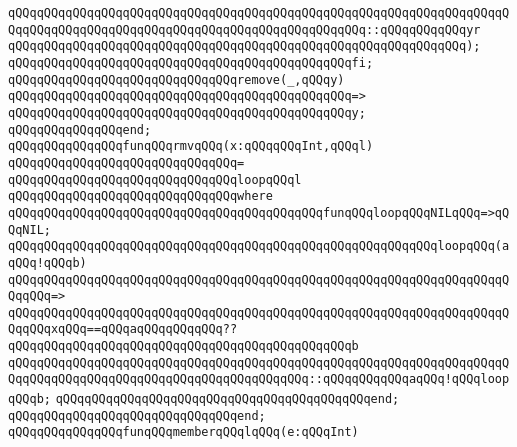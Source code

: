 \verb|qQQqqQQqqQQqqQQqqQQqqQQqqQQqqQQqqQQqqQQqqQQqqQQqqQQqqQQqqQQqqQQqqQQqqQQqqQQqqQQqqQQqqQQqqQQqqQQqqQQqqQQqqQQqqQQqqQQqqQQq::qQQqqQQqqQQqyr|\newline
\verb|qQQqqQQqqQQqqQQqqQQqqQQqqQQqqQQqqQQqqQQqqQQqqQQqqQQqqQQqqQQqqQQq);|\newline
\verb|qQQqqQQqqQQqqQQqqQQqqQQqqQQqqQQqqQQqqQQqqQQqqQQqfi;|\newline
\newline
\verb|qQQqqQQqqQQqqQQqqQQqqQQqqQQqqQQqremove(_,qQQqy)|\newline
\verb|qQQqqQQqqQQqqQQqqQQqqQQqqQQqqQQqqQQqqQQqqQQqqQQq=>|\newline
\verb|qQQqqQQqqQQqqQQqqQQqqQQqqQQqqQQqqQQqqQQqqQQqqQQqy;|\newline
\verb|qQQqqQQqqQQqqQQqend;|\newline
\newline
\newline
\verb|qQQqqQQqqQQqqQQqfunqQQqrmvqQQq(x:qQQqqQQqInt,qQQql)|\newline
\verb|qQQqqQQqqQQqqQQqqQQqqQQqqQQqqQQq=|\newline
\verb|qQQqqQQqqQQqqQQqqQQqqQQqqQQqqQQqloopqQQql|\newline
\verb|qQQqqQQqqQQqqQQqqQQqqQQqqQQqqQQqwhere|\newline
\verb|qQQqqQQqqQQqqQQqqQQqqQQqqQQqqQQqqQQqqQQqqQQqfunqQQqloopqQQqNILqQQq=>qQQqNIL;|\newline
\newline
\verb|qQQqqQQqqQQqqQQqqQQqqQQqqQQqqQQqqQQqqQQqqQQqqQQqqQQqqQQqqQQqloopqQQq(aqQQq!qQQqb)|\newline
\verb|qQQqqQQqqQQqqQQqqQQqqQQqqQQqqQQqqQQqqQQqqQQqqQQqqQQqqQQqqQQqqQQqqQQqqQQqqQQq=>|\newline
\verb|qQQqqQQqqQQqqQQqqQQqqQQqqQQqqQQqqQQqqQQqqQQqqQQqqQQqqQQqqQQqqQQqqQQqqQQqqQQqxqQQq==qQQqaqQQqqQQqqQQq??qQQqqQQqqQQqqQQqqQQqqQQqqQQqqQQqqQQqqQQqqQQqqQQqb|\newline
\verb|qQQqqQQqqQQqqQQqqQQqqQQqqQQqqQQqqQQqqQQqqQQqqQQqqQQqqQQqqQQqqQQqqQQqqQQqqQQqqQQqqQQqqQQqqQQqqQQqqQQqqQQqqQQqqQQq::qQQqqQQqqQQqaqQQq!qQQqloopqQQqb;|\newline
\verb|qQQqqQQqqQQqqQQqqQQqqQQqqQQqqQQqqQQqqQQqqQQqend;|\newline
\verb|qQQqqQQqqQQqqQQqqQQqqQQqqQQqqQQqend;|\newline
\newline
\newline
\verb|qQQqqQQqqQQqqQQqfunqQQqmemberqQQqlqQQq(e:qQQqInt)|\newline
